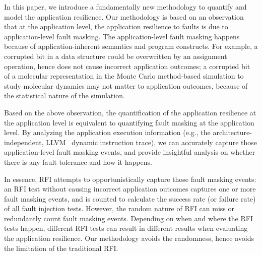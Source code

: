 In this paper, we introduce a fundamentally new methodology to quantify and model the application resilience. Our methodology is based on an observation that at the application level, the application resilience to faults is due to application-level fault masking.
The application-level fault masking happens because of application-inherent semantics and program constructs. For example, a corrupted bit in a data structure could be overwritten by an assignment operation, hence does not cause
incorrect application outcomes; a corrupted bit of a molecular representation in the Monte Carlo method-based simulation to
study molecular dynamics may not matter to application outcomes, because of the statistical nature of the simulation.

Based on the above observation, the quantification of the application resilience at the application level
is equivalent to quantifying fault masking at the application level.
By analyzing the application execution information (e.g., the architecture-independent, LLVM~\cite{llvm_lrm} dynamic instruction trace), we can accurately capture those application-level fault masking events, and provide insightful analysis on whether there is any fault tolerance and how it happens.

In essence, RFI attempts to opportunistically capture those fault masking events:
an RFI test without causing incorrect application outcomes 
captures one or more fault masking events, and is counted 
to calculate the success rate (or failure rate) of all fault injection tests.
However, the random nature of RFI can miss or redundantly count fault masking events.
Depending on when and where the RFI tests happen, different RFI tests 
can result in different results when evaluating the application resilience.
Our methodology avoids the randomness, hence avoids the limitation of
the traditional RFI.   

